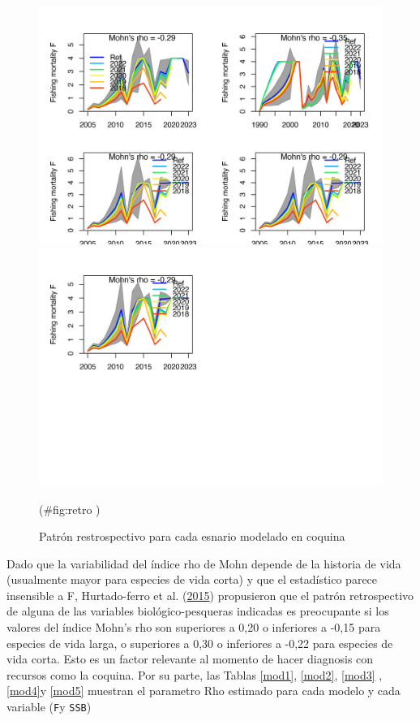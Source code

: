 \documentclass[
]{article}
\begin{document}
\begin{figure}[H]

{\centering \includegraphics{Dtrunculus_SS3_2024_files/figure-latex/retro -1} \includegraphics{Dtrunculus_SS3_2024_files/figure-latex/retro -2} 

}

\caption{\label{retro}Patrón restrospectivo para cada esnario modelado en coquina}(\#fig:retro )
\end{figure}

Dado que la variabilidad del índice rho de Mohn depende de la historia de vida (usualmente
mayor para especies de vida corta) y que el estadístico parece insensible a F, Hurtado-ferro et al. (\protect\hyperlink{ref-Hurtado2014}{2015})
propusieron que el patrón retrospectivo de alguna de las variables biológico-pesqueras indicadas es
preocupante si los valores del índice Mohn's rho son superiores a 0,20 o inferiores a -0,15 para especies
de vida larga, o superiores a 0,30 o inferiores a -0,22 para especies de vida corta. Esto es un factor relevante al momento de hacer diagnosis con recursos como la coquina.
Por su parte, las Tablas \ref{mod1}, \ref{mod2}, \ref{mod3} , \ref{mod4}y \ref{mod5} muestran el parametro Rho estimado para cada modelo y cada variable (\texttt{F}y \texttt{SSB})
\end{document}
